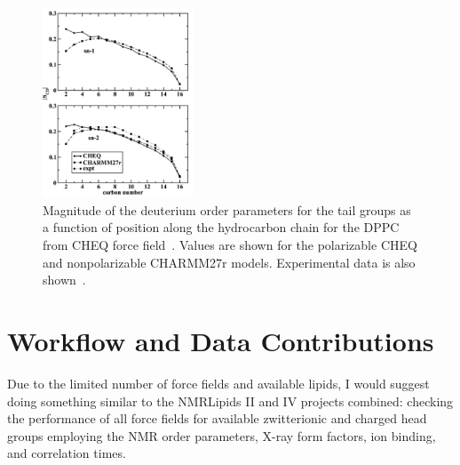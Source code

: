 \documentclass[12pt]{article}
\begin{document}
\begin{figure}[!hbt]
	
	\centering
	\includegraphics[width=0.4\textwidth]{../Figures/dppc_order_parameters_cheq.png}
	\caption{Magnitude of the deuterium order parameters for the tail groups as a function of position along the hydrocarbon chain for the DPPC from CHEQ force field~\cite{davis2009charge}. Values are shown for the polarizable CHEQ and nonpolarizable CHARMM27r models. Experimental data is also shown~\cite{douliez1995restatement}.}
	\label{fig:dppccheq}
	
\end{figure}

\section{Workflow and Data Contributions}

Due to the limited number of force fields and available lipids, I would suggest
doing something similar to the NMRLipids II and IV projects combined: checking
the performance of all force fields for available zwitterionic and charged head
groups employing the NMR order parameters, X-ray form factors, ion binding, and correlation times. \\

\end{document}
